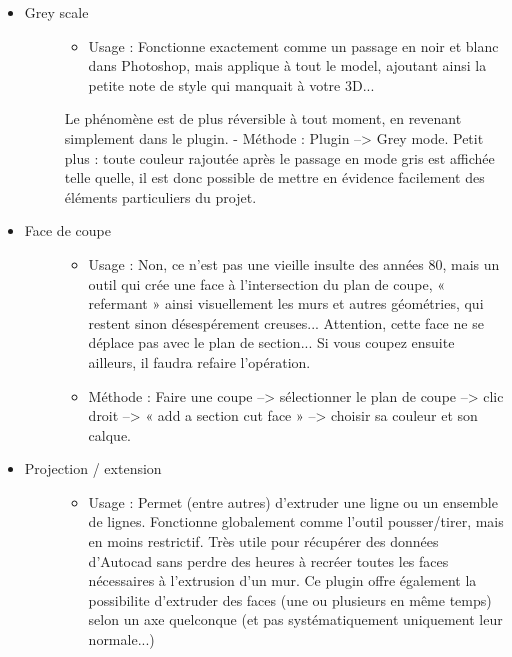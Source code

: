 \documentclass[a4paper,12pt,french]{sphinxmanual}
\begin{document}
\begin{itemize}
\begin{description}
\begin{itemize}
\end{itemize}

\end{description}

\item {} \begin{description}
\item[{Grey scale}] \leavevmode\begin{itemize}
\item {} 
Usage : Fonctionne exactement comme un passage en noir et blanc dans Photoshop, mais applique à tout le model, ajoutant ainsi la petite note de style qui manquait à votre 3D...

\end{itemize}

Le phénomène est de plus réversible à tout moment, en revenant simplement dans le plugin.
- Méthode : Plugin --\textgreater{} Grey mode. Petit plus : toute couleur rajoutée après le passage en mode gris est affichée telle quelle, il est donc possible de mettre en évidence facilement des éléments particuliers du projet.

\end{description}

\item {} \begin{description}
\item[{Face de coupe}] \leavevmode\begin{itemize}
\item {} 
Usage : Non, ce n'est pas une vieille insulte des années 80, mais un outil qui crée une face à l'intersection du plan de coupe, « refermant » ainsi visuellement les murs et autres géométries, qui restent sinon désespérement creuses... Attention, cette face ne se déplace pas avec le plan de section... Si vous coupez ensuite ailleurs, il faudra refaire l'opération.

\item {} 
Méthode : Faire une coupe --\textgreater{} sélectionner le plan de coupe --\textgreater{} clic droit --\textgreater{} « add a section cut face » --\textgreater{} choisir sa couleur et son calque.

\end{itemize}

\end{description}

\item {} \begin{description}
\item[{Projection / extension}] \leavevmode\begin{itemize}
\item {} 
Usage : Permet (entre autres) d'extruder une ligne ou un ensemble de lignes. Fonctionne globalement comme l'outil pousser/tirer, mais en moins restrictif. Très utile pour récupérer des données d'Autocad sans perdre des heures à recréer toutes les faces nécessaires à l'extrusion d'un mur. Ce plugin offre également la possibilite d'extruder des faces (une ou  plusieurs en même temps) selon un axe quelconque (et pas systématiquement uniquement leur normale...)


\end{itemize}
\end{description}
\end{itemize}
\end{document}
